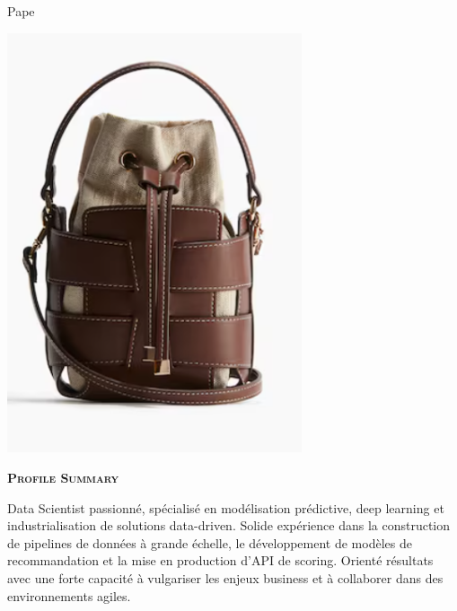 \documentclass[11pt,a4paper]{article}
\newcommand{\headleft}[1]{\vspace*{3ex}\textsc{\textbf{#1}}\par%
    \vspace*{-1.5ex}\hrulefill\par\vspace*{0.7ex}}
\begin{document}
\setlength{\topskip}{0pt}\setlength{\parindent}{0pt}\setlength{\parskip}{0pt}
\setlength{\fboxsep}{0pt}\pagestyle{empty}\raggedbottom

\begin{minipage}[t]{0.33\textwidth}
\colorbox{cvblue}{\begin{minipage}[t][5mm][t]{\textwidth}\null\hfill\null\end{minipage}}
\vspace{-.2ex}
\colorbox{cvblue!90}{\color{white}
\textwidth
\begin{minipage}[t][293mm][t]{0.82\textwidth}\raggedright
\vspace*{2.5ex}

\Large Pape \textbf{\textscFALL} \normalsize


\null\hfill\includegraphics[width=0.65\textwidth]{ 130bd7b081e64605898e286285842bbd.png }\hfill\null


\vspace*{0.5ex}

\headleft{Profile Summary}
Data Scientist passionné, spécialisé en modélisation prédictive, deep learning et industrialisation de solutions data-driven. Solide expérience dans la construction de pipelines de données à grande échelle, le développement de modèles de recommandation et la mise en production d’API de scoring. Orienté résultats avec une forte capacité à vulgariser les enjeux business et à collaborer dans des environnements agiles.


\end{minipage}}
\end{minipage}
\end{document}
